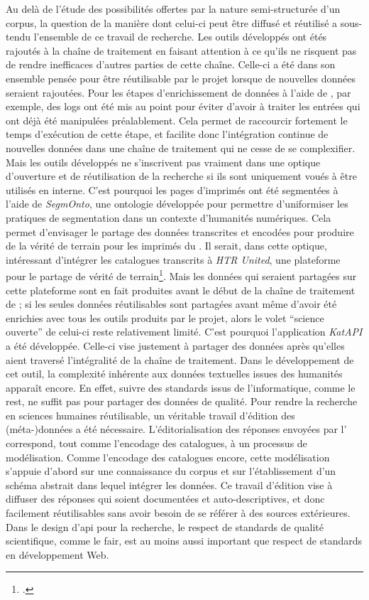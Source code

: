 Au delà de l'étude des possibilités offertes par la nature semi-structurée d'un corpus, la question de la manière dont celui-ci peut être diffusé et réutilisé a sous-tendu l'ensemble de ce travail de recherche. Les outils développés ont étés rajoutés à la chaîne de traitement en faisant attention à ce qu'ils ne risquent pas de rendre inefficaces d'autres parties de cette chaîne. Celle-ci a été dans son ensemble pensée pour être réutilisable par le projet lorsque de nouvelles données seraient rajoutées. Pour les étapes d'enrichissement de données à l'aide de \wkd{}, par exemple, des \glspl{log} ont été mis au point pour éviter d'avoir à traiter les entrées qui ont déjà été manipulées préalablement. Cela permet de raccourcir fortement le temps d'exécution de cette étape, et facilite donc l'intégration continue de nouvelles données dans une chaîne de traitement qui ne cesse de se complexifier. Mais les outils développés ne s'inscrivent pas vraiment dans une optique d'ouverture et de réutilisation de la recherche si ils sont uniquement voués à être utilisés en interne. C'est pourquoi les pages d'imprimés ont été segmentées à l'aide de \textit{SegmOnto}, une ontologie développée pour permettre d'uniformiser les pratiques de segmentation dans un contexte d'humanités numériques. Cela permet d'envisager le partage des données transcrites et encodées pour produire de la vérité de terrain pour les imprimés du . Il serait, dans cette optique, intéressant d'intégrer les catalogues transcrits à \textit{HTR United}, une plateforme pour le partage de vérité de terrain\footcite{chague_sharing_2022}. Mais les données qui seraient partagées sur cette plateforme sont en fait produites avant le début de la chaîne de traitement de \mssktb{}; si les seules données réutilisables sont partagées avant même d'avoir été enrichies avec tous les outils produits par le projet, alors le volet \enquote{science ouverte} de celui-ci reste relativement limité. C'est pourquoi l'application \textit{KatAPI} a été développée. Celle-ci vise justement à partager des données après qu'elles aient traversé l'intégralité de la chaîne de traitement. Dans le développement de cet outil, la complexité inhérente aux données textuelles issues des humanités apparaît encore. En effet, suivre des standards issus de l'informatique, comme le \gls{rest}, ne suffit pas pour partager des données de qualité. Pour rendre la recherche en sciences humaines réutilisable, un véritable travail d'édition des (méta-)données a été nécessaire. L'éditorialisation des réponses envoyées par l'\api{} correspond, tout comme l'encodage des catalogues, à un processus de modélisation. Comme l'encodage des catalogues encore, cette modélisation s'appuie d'abord sur une connaissance du corpus et sur l'établissement d'un schéma abstrait dans lequel intégrer les données. Ce travail d'édition vise à diffuser des réponses qui soient documentées et auto-descriptives, et donc facilement réutilisables sans avoir besoin de se référer à des sources extérieures. Dans le design d'\gls{api} pour la recherche, le respect de standards de qualité scientifique, comme le \gls{fair}, est au moins aussi important que respect de standards en développement Web.

